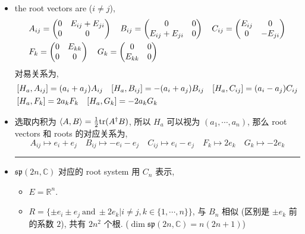 \begin{itemize}
	\item the root vectors are ($i \neq j$),
	\begin{align}
		& A_{i j} = \begin{pmatrix}
			0 & E_{i j} + E_{j i} \\
			0 & 0
		\end{pmatrix} \quad B_{i j} = \begin{pmatrix}
			0 & 0 \\
			E_{i j} + E_{j i} & 0
		\end{pmatrix} \quad C_{i j} = \begin{pmatrix}
			E_{i j} & 0 \\
			0 & - E_{j i}
		\end{pmatrix} \notag \\
		& F_k = \begin{pmatrix}
			0 & E_{k k} \\
			0 & 0
		\end{pmatrix} \quad G_k = \begin{pmatrix}
			0 & 0 \\
			E_{k k} & 0
		\end{pmatrix}
	\end{align}
	对易关系为,
	\begin{align}
		& [H_a, A_{i j}] = (a_i + a_j) A_{i j} \quad [H_a, B_{i j}] = - (a_i + a_j) B_{i j} \quad [H_a, C_{i j}] = (a_i - a_j) C_{i j} \notag \\
		& [H_a, F_k] = 2 a_k F_k \quad [H_a, G_k] = - 2 a_k G_k
	\end{align}
	
	\item 选取内积为 $\braket{A, B} = \frac{1}{2} \mathrm{tr}(A^\dag B)$, 所以 $H_a$ 可以视为 $(a_1, \cdots, a_n)$, 那么 root vectors 和 roots 的对应关系为,
	\begin{equation}
		A_{i j} \mapsto e_i + e_j \quad B_{i j} \mapsto - e_i - e_j \quad C_{i j} \mapsto e_i - e_j \quad F_k \mapsto 2 e_k \quad G_k \mapsto - 2 e_k
	\end{equation}
	
	\noindent\rule[0.5ex]{\linewidth}{0.5pt} %
	
	\item $\mathfrak{sp}(2 n, \mathbb{C})$ 对应的 root system 用 $C_n$ 表示,
	\begin{itemize}
		\item $E = \mathbb{R}^n$.
		
		\item $R = \{\pm e_i \pm e_j \ \text{and} \ \pm 2 e_k | i \neq j, k \in \{1, \cdots, n\}\}$, 与 $B_n$ 相似 (区别是 $\pm e_k$ 前的系数 $2$), 共有 $2 n^2$ 个根. ($\dim \mathfrak{sp}(2 n, \mathbb{C}) = n (2 n + 1)$)
		

\end{itemize}
\end{itemize}
